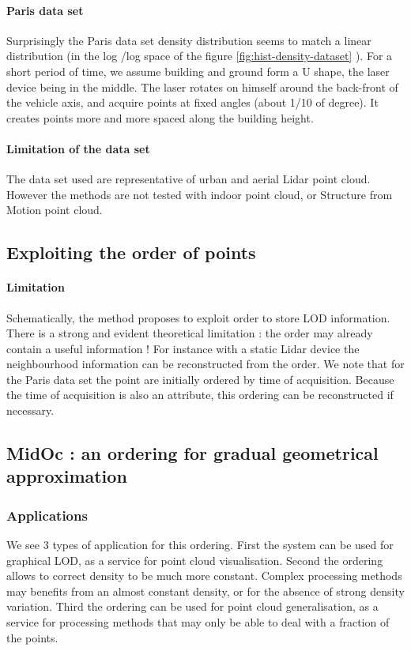 		 \paragraph{Paris data set}
			 Surprisingly the Paris data set density distribution seems to match a linear distribution (in the log /log space of the figure \ref{fig:hist-density-dataset} ).
			 For a short period of time, we assume building and ground form a U shape, the laser device being in the middle. The laser rotates on himself around the back-front of the vehicle axis, and acquire points at fixed angles (about 1/10 of degree). It creates points more and more spaced along the building height.
			 
		 \paragraph{Limitation of the data set}
			 The data set used are representative of urban and aerial Lidar point cloud. However the methods are not tested with indoor point cloud, or Structure from Motion point cloud.
		 
	 \subsection{Exploiting the order of points}
		 \paragraph{Limitation}
			 Schematically, the method proposes to exploit order to store LOD information. There is a strong and evident theoretical limitation : the order may already contain a useful information !
			 For instance with a static Lidar device the neighbourhood information can be reconstructed from the order. We note that for the Paris data set the point are initially ordered by time of acquisition. Because the time of acquisition is also an attribute, this ordering can be reconstructed if necessary.
			 
	 \subsection{MidOc : an ordering for gradual geometrical approximation}
	 	\subsubsection{Applications}
	 	We see 3 types of application for this ordering. First the system can be used for graphical LOD, as a service for point cloud visualisation. Second the ordering allows to correct density to be much more constant. Complex processing methods may benefits from an almost constant density, or for the absence of strong density variation. Third the ordering can be used for point cloud generalisation, as a service for processing methods that may only be able to deal with a fraction of the points.  
	 	
